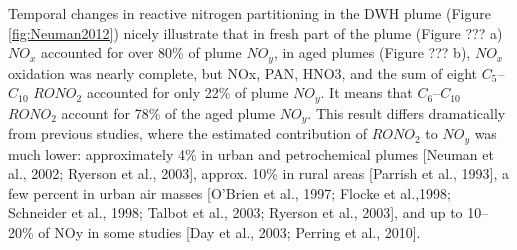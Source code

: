 \documentclass[11pt,a4paper]{article}
\begin{document}
Temporal changes in reactive nitrogen partitioning in the DWH plume (Figure \ref{fig:Neuman2012}) nicely illustrate that in fresh part of the plume (Figure ??? a) $NO_x$ accounted for over 80\% of plume $NO_y$, in aged plumes (Figure ??? b), $NO_x$ oxidation was nearly complete, but NOx, PAN, HNO3, and the sum of eight $C_5$–$C_{10}$ $RONO_2$ accounted for only 22\% of plume $NO_y$. It means that $C_6$–$C_{10}$ $RONO_2$ account for 78\% of the aged plume $NO_y$\citep{Neuman2012}. This result differs dramatically from previous studies, where the estimated contribution of $RONO_2$ to $NO_y$ was much lower: approximately 4\% in urban and petrochemical plumes [Neuman et al., 2002; Ryerson et al., 2003], approx. 10\% in rural areas [Parrish et al., 1993], a few percent in urban air masses [O’Brien et al., 1997; Flocke et al.,1998; Schneider et al., 1998; Talbot et al., 2003; Ryerson et al., 2003], and up to 10–20\% of NOy in some studies [Day et al., 2003; Perring et al., 2010].
\end{document}
